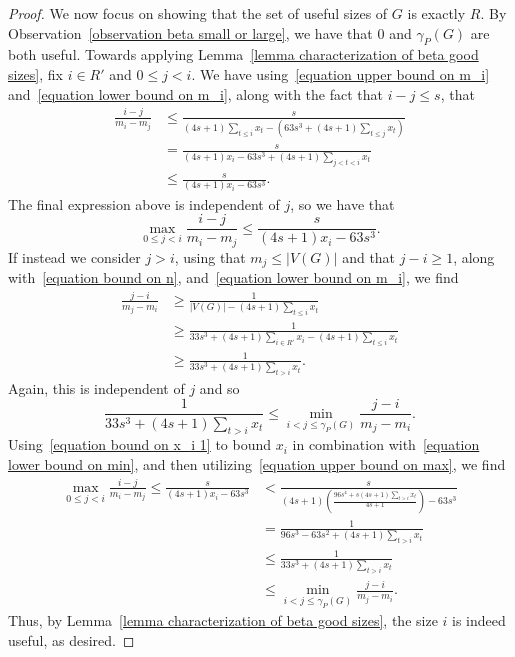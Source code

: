 \documentclass{article}
\begin{document}
\begin{proof}
            We now focus on showing that the set of useful sizes of $G$ is exactly $R$.
            By Observation~\ref{observation beta small or large}, we have that $0$ and $\gamma_P(G)$ are both useful.
            Towards applying Lemma~\ref{lemma characterization of beta good sizes}, fix $i\in R'$ and $0\leq j<i$.
            We have using~\eqref{equation upper bound on m_i} and~\eqref{equation lower bound on m_i}, along with the fact that $i-j\leq s$, that
                \begin{align*}
                    \frac{i-j}{m_i-m_j} &\leq \frac{s}{(4s+1)\displaystyle\sum_{t\leq i}x_{t}-\left(63s^3+ (4s+1)\sum_{t\leq j} x_{t}\right)}\\
                    &= \frac{s}{(4s+1)x_i - 63s^3 + (4s+1) \displaystyle\sum_{j < t < i}x_t}\\
                    &\leq \frac{s}{(4s+1)x_i-63s^3}.
                \end{align*}
            The final expression above is independent of $j$, so we have that
            \begin{equation}\label{equation upper bound on max}
                \max_{0\leq j<i}\frac{i-j}{m_i-m_j}\leq\frac{s}{(4s+1)x_i-63s^3}.
            \end{equation}
            If instead we consider $j>i$, using that $m_j\leq |V(G)|$ and that $j-i\geq 1$, along with~\eqref{equation bound on n}, and~\eqref{equation lower bound on m_i}, we find
            \begin{align*}
                \frac{j-i}{m_j-m_i} &\geq \frac{1}{|V(G)|-(4s+1)\displaystyle\sum_{t\leq i}x_{t}}\\
                &\geq \frac{1}{33s^3 + (4s+1)\displaystyle\sum_{i\in R'}x_i-(4s+1)\displaystyle\sum_{t\leq i}x_{t}}\\
                &\geq \frac{1}{33s^3 +(4s+1)\displaystyle\sum_{t>i}x_{t}}.
            \end{align*}
            Again, this is independent of $j$ and so 
            \begin{equation}\label{equation lower bound on min}
                \frac{1}{33s^3+(4s+1)\displaystyle\sum_{t>i}x_{t}}\leq \min_{i<j\leq \gamma_P(G)}\frac{j-i}{m_j-m_i}.
            \end{equation}
            Using~\eqref{equation bound on x_i 1} to bound $x_i$ in combination with~\eqref{equation lower bound on min}, and then utilizing~\eqref{equation upper bound on max}, we find
            \begin{align*}
                \max_{0\leq j<i}\frac{i-j}{m_i-m_j} \leq\frac{s}{(4s+1)x_i-63s^3}&<\frac{s}{(4s+1)\left( \frac{96s^4+s(4s+1)\displaystyle\sum_{t>i}x_{t} }{4s+1}\right)-63s^3}\\
                &=\frac{1}{96s^3-63s^2+(4s+1)\displaystyle\sum_{t>i}x_{t}}\\   
                &\leq  \frac{1}{33s^3 +(4s+1)\displaystyle\sum_{t>i}x_{t}}  \\
                &\leq \min_{i<j\leq \gamma_P(G)}\frac{j-i}{m_j-m_i}.
                \end{align*}
            Thus, by Lemma~\ref{lemma characterization of beta good sizes}, the size $i$ is indeed useful, as desired.
            

\end{proof}
\end{document}
